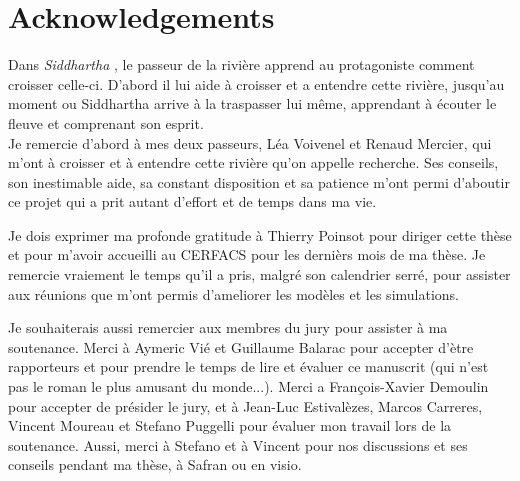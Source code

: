 \chapter*{Acknowledgements}
    
Dans \textsl{Siddhartha} , le passeur de la rivière apprend au protagoniste comment croisser celle-ci. D'abord il lui aide à croisser et a entendre cette rivière, jusqu'au moment ou Siddhartha arrive à la traspasser lui même, apprendant à écouter le fleuve et comprenant son esprit. \\  %
%
Je remercie d'abord à mes deux passeurs, Léa Voivenel et Renaud Mercier, qui m'ont  à croisser et à entendre cette rivière qu'on appelle recherche. Ses conseils, son inestimable aide, sa constant disposition et sa patience m'ont permi d'aboutir ce projet qui a prit autant d'effort et de temps dans ma vie.

Je dois exprimer ma profonde gratitude à Thierry Poinsot pour diriger cette thèse et pour m'avoir accueilli au CERFACS pour les dernièrs mois de ma thèse. Je remercie vraiement le temps qu'il a pris, malgré son calendrier serré, pour assister aux réunions que m'ont permis d'ameliorer les modèles et les simulations.

Je souhaiterais aussi remercier aux membres du jury pour assister à ma soutenance. Merci à Aymeric Vié et Guillaume Balarac pour accepter d'ètre rapporteurs et pour prendre le temps de lire et évaluer ce manuscrit (qui n'est pas le roman le plus amusant du monde...).  Merci a François-Xavier Demoulin pour accepter de présider le jury, et à Jean-Luc Estivalèzes, Marcos Carreres, Vincent Moureau et Stefano Puggelli pour évaluer mon travail lors de la soutenance. Aussi, merci à Stefano et à Vincent pour nos discussions et ses conseils pendant ma thèse, à Safran ou en visio. 

